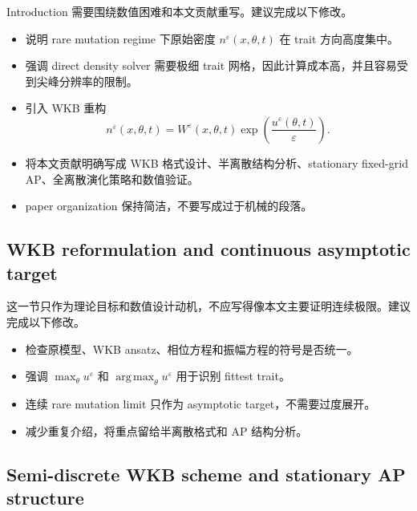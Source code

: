 \documentclass[11pt,a4paper]{ctexart}
\newcommand{\eps}{\varepsilon}
\newcommand{\argmax}{\operatorname*{arg\,max}}
\begin{document}
Introduction 需要围绕数值困难和本文贡献重写。建议完成以下修改。
\begin{itemize}
    \item 说明 rare mutation regime 下原始密度 $n^\eps(x,\theta,t)$ 在 trait 方向高度集中。
    \item 强调 direct density solver 需要极细 trait 网格，因此计算成本高，并且容易受到尖峰分辨率的限制。
    \item 引入 WKB 重构
    \begin{equation*}
        n^\eps(x,\theta,t)
        = W^\eps(x,\theta,t)
        \exp\!\left(\frac{u^\eps(\theta,t)}{\eps}\right).
    \end{equation*}
    \item 将本文贡献明确写成 WKB 格式设计、半离散结构分析、stationary fixed-grid AP、全离散演化策略和数值验证。
    \item paper organization 保持简洁，不要写成过于机械的段落。
\end{itemize}

\subsection{WKB reformulation and continuous asymptotic target}

这一节只作为理论目标和数值设计动机，不应写得像本文主要证明连续极限。建议完成以下修改。
\begin{itemize}
    \item 检查原模型、WKB ansatz、相位方程和振幅方程的符号是否统一。
    \item 强调 $\max_\theta u^\eps$ 和 $\argmax_\theta u^\eps$ 用于识别 fittest trait。
    \item 连续 rare mutation limit 只作为 asymptotic target，不需要过度展开。
    \item 减少重复介绍，将重点留给半离散格式和 AP 结构分析。
\end{itemize}

\subsection{Semi-discrete WKB scheme and stationary AP structure}
\end{document}
